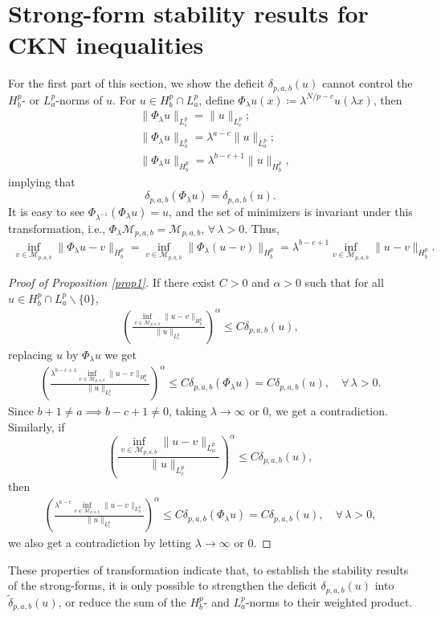 \documentclass[11pt]{article}
\numberwithin{equation}{section}
\begin{document}
\section{Strong-form stability results for CKN inequalities}\label{section 3}

For the first part of this section, we show the deficit $\delta_{p,a,b}(u)$ cannot control the $H^p_b$- or $L^p_a$-norms of $u$. For $u\in H^p_b\cap L^p_a$, define $\Phi_\lambda u(x) \coloneqq \lambda^{N/p-c}u(\lambda x)$, then
\begin{align*}
    & \|\Phi_\lambda u\|_{L^p_c} = \|u\|_{L^p_c}; \\
    & \|\Phi_\lambda u\|_{L^p_a} = \lambda^{a-c}\|u\|_{L^p_a}; \\
    & \|\Phi_\lambda u\|_{H^p_b} = \lambda^{b-c+1}\|u\|_{H^p_b},
\end{align*}
implying that
\[ \delta_{p,a,b}(\Phi_\lambda u) = \delta_{p,a,b}(u). \]
It is easy to see $\Phi_{\lambda^{-1}}(\Phi_\lambda u) = u$, and the set of minimizers is invariant under this transformation, i.e.,  $\Phi_\lambda \mathcal{M}_{p,a,b} = \mathcal{M}_{p,a,b}$, $\forall\, \lambda>0$. Thus,
\begin{align*}
    \inf_{v\in\mathcal{M}_{p,a,b}}\|\Phi_\lambda u-v\|_{H^p_b} = \inf_{v\in\mathcal{M}_{p,a,b}}\|\Phi_\lambda(u-v)\|_{H^p_b} = \lambda^{b-c+1} \inf_{v\in \mathcal{M}_{p,a,b}}\|u-v\|_{H^p_b}.
\end{align*}
\begin{proof}[Proof of Proposition \ref{prop1}]
    If there exist $C>0$ and $\alpha>0$ such that for all $u \in H^p_b \cap L^p_a \backslash \{0\}$,
    \begin{align*}
        \left( \frac{\inf_{v\in \mathcal{M}_{p,a,b}}\|u-v\|_{H^p_b} }{\|u\|_{L^p_c}} \right)^\alpha \le C \delta_{p,a,b}(u),
    \end{align*}
    replacing $u$ by $\Phi_\lambda u$ we get
    \begin{align*}
        \left(\frac{\lambda^{b-c+1}\inf_{v\in \mathcal{M}_{p,a,b}}\|u-v\|_{H^p_b}}{\|u\|_{L^p_c}}\right)^\alpha \le C \delta_{p,a,b}(\Phi_\lambda u) = C \delta_{p,a,b}(u),\quad \forall\,\lambda>0.
    \end{align*}
    Since $b+1\neq a\implies b-c+1\neq 0$, taking $\lambda\to \infty$ or $0$, we get a contradiction. Similarly, if
    \[ \left( \frac{\inf_{v\in \mathcal{M}_{p,a,b}}\|u-v\|_{L^p_a} }{\|u\|_{L^p_c}} \right)^\alpha \le C \delta_{p,a,b}(u),\]
    then
    \begin{align*}
        \left(\frac{\lambda^{a-c}\inf_{v\in \mathcal{M}_{p,a,b}}\|u-v\|_{L^p_a}}{\|u\|_{L^p_c}}\right)^\alpha \le C \delta_{p,a,b}(\Phi_\lambda u) = C \delta_{p,a,b}(u),\quad \forall\,\lambda>0,
    \end{align*}
    we also get a contradiction by letting $\lambda \to \infty$ or $0$.
\end{proof}
These properties of transformation indicate that, to establish the stability results of the strong-forms, it is only possible to strengthen the deficit $\delta_{p,a,b}(u)$ into $\tilde{\delta}_{p,a,b}(u)$, or reduce the sum of the $H^p_b$- and $L^p_a$-norms to their weighted product.
\end{document}
